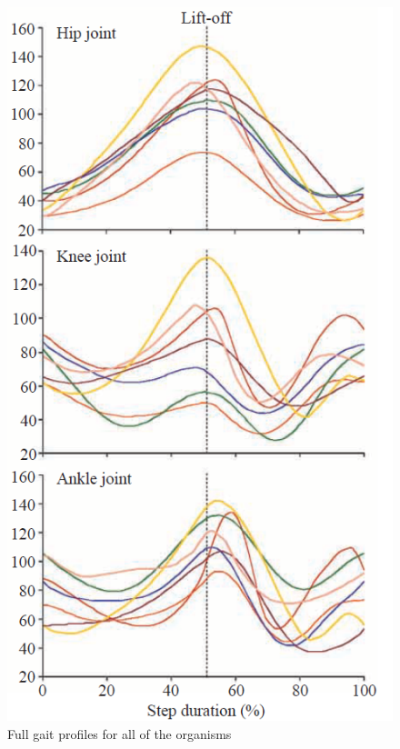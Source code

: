 \documentclass[runningheads,a4paper]{llncs}
\begin{document}
			\begin{figure}
				\centering
				\begin{minipage}{0.5\textwidth}
					\centering
					\includegraphics[width=\textwidth]{FischerAngles.PNG}
					\caption{Full gait profiles for all of the organisms}
				\end{minipage}\hfill
				\begin{minipage}{0.5\textwidth}

\end{minipage}
\end{figure}
\end{document}
